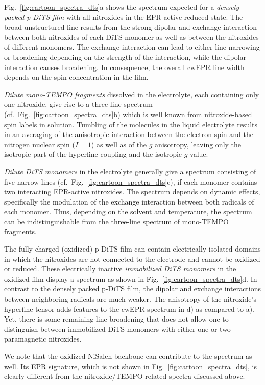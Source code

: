 Fig.~\ref{fig:cartoon_spectra_dts}a shows the spectrum expected for a \emph{densely packed p-DiTS film} with all nitroxides in the EPR-active reduced state. The broad unstructured line results from the strong dipolar and exchange interaction between both nitroxides of each DiTS monomer as well as between the nitroxides of different monomers. The exchange interaction can lead to either line narrowing or broadening depending on the strength of the interaction,\cite{Anderson1953} while the dipolar interaction causes broadening. In consequence, the overall cwEPR line width depends on the spin concentration in the film.
\par 
\emph{Dilute mono-TEMPO fragments} dissolved in the electrolyte, each containing only one nitroxide, give rise to a three-line spectrum (cf.\ Fig.~\ref{fig:cartoon_spectra_dts}b) which is well known from nitroxide-based spin labels in solution.\cite{Liu2008} Tumbling of the molecules in the liquid electrolyte results in an averaging of the anisotropic interaction between the electron spin and the nitrogen nuclear spin ($I = 1$) as well as of the $g$ anisotropy, leaving only the isotropic part of the hyperfine coupling and the isotropic $g$ value. 
\par
\emph{Dilute DiTS monomers} in the electrolyte generally give a spectrum consisting of five narrow lines (cf.\ Fig.~\ref{fig:cartoon_spectra_dts}c), if each monomer contains two interacting EPR-active nitroxides. The spectrum depends on dynamic effects, specifically the modulation of the exchange interaction between both radicals of each monomer.  Thus, depending on the solvent and temperature, the spectrum can be indistinguishable from the three-line spectrum of mono-TEMPO fragments.
\par
The fully charged (oxidized) p-DiTS film can contain electrically isolated domains in which the nitroxides are not connected to the electrode and cannot be oxidized or reduced. These electrically inactive \emph{immobilized DiTS monomers} in the oxidized film display a spectrum as shown in Fig.~\ref{fig:cartoon_spectra_dts}d. In contrast to the densely packed p-DiTS film, the dipolar and exchange interactions between neighboring radicals are much weaker. The anisotropy of the nitroxide's hyperfine tensor adds features to the cwEPR spectrum in d) as compared to a).
Yet, there is some remaining line broadening that does not allow one to distinguish between immobilized DiTS monomers with either one or two paramagnetic nitroxides.
\par
We note that the oxidized NiSalen backbone can contribute to the spectrum as well. Its EPR signature, which is not shown in Fig.~\ref{fig:cartoon_spectra_dts}, is clearly different from the nitroxide/TEMPO-related spectra discussed above.
%
























